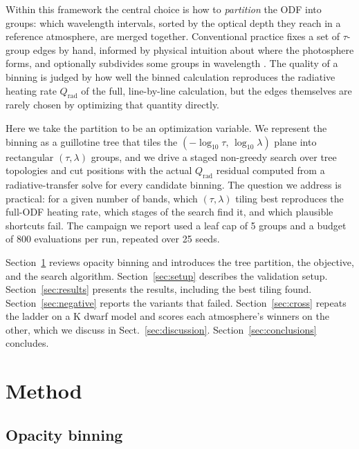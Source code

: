 \documentclass{aa}
\begin{document}
   Within this framework the central choice is how to \emph{partition}
   the ODF into groups: which wavelength intervals, sorted by the optical
   depth they reach in a reference atmosphere, are merged together.
   Conventional practice fixes a set of $\tau$-group edges by hand,
   informed by physical intuition about where the photosphere forms, and
   optionally subdivides some groups in wavelength \citep{vogler2004}.
   The quality of a binning is judged by how well the binned calculation
   reproduces the radiative heating rate $Q_\mathrm{rad}$ of the full,
   line-by-line calculation, but the edges themselves are rarely chosen
   by optimizing that quantity directly.

   Here we take the partition to be an optimization variable. We
   represent the binning as a guillotine tree that tiles the
   $(-\log_{10}\tau,\,\log_{10}\lambda)$ plane into rectangular
   $(\tau,\lambda)$ groups, and we drive a staged non-greedy search over
   tree topologies and cut positions with the actual $Q_\mathrm{rad}$
   residual computed from a radiative-transfer solve for every candidate
   binning. The question we address is practical: for a given number of
   bands, which $(\tau,\lambda)$ tiling best reproduces the full-ODF
   heating rate, which stages of the search find it, and which plausible
   shortcuts fail. The campaign we report used a leaf cap of 5 groups
   and a budget of 800 evaluations per run, repeated over 25 seeds.

   Section~\ref{sec:method} reviews opacity binning and introduces the
   tree partition, the objective, and the search algorithm.
   Section~\ref{sec:setup} describes the validation setup.
   Section~\ref{sec:results} presents the results, including the best
   tiling found. Section~\ref{sec:negative} reports the variants that
   failed. Section~\ref{sec:cross} repeats the ladder on a K dwarf model
   and scores each atmosphere's winners on the other, which we discuss in
   Sect.~\ref{sec:discussion}. Section~\ref{sec:conclusions} concludes.

\section{Method}
\label{sec:method}

\subsection{Opacity binning}
\label{sec:binning}
\end{document}
